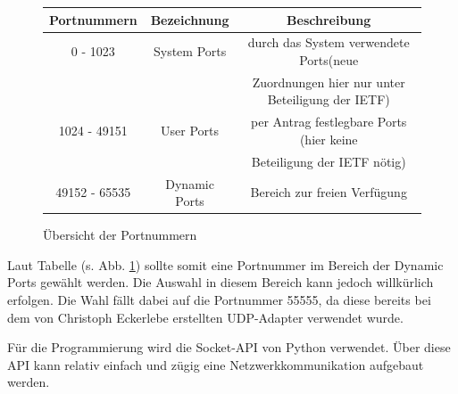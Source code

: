 \documentclass[12pt,a4paper]{report}
\begin{document}
\begin{figure}[H]
\begin{center}
\begin{tabular}{|c|c|c|}
\hline
Portnummern & Bezeichnung & Beschreibung \\
\hline\hline
0 - 1023 & System Ports & durch das System verwendete Ports(neue\\&&Zuordnungen hier nur unter Beteiligung der IETF)\\
1024 - 49151 & User Ports & per Antrag festlegbare Ports (hier keine\\&&Beteiligung der IETF nötig)\\
49152 - 65535 & Dynamic Ports & Bereich zur freien Verfügung\\
\hline
\end{tabular}
\caption{Übersicht der Portnummern \cite{WikipediaPort}\cite{IETFRFC6335}}\label{tab:Uebersicht der Portnummern}
\end{center}
\end{figure}
\noindent Laut Tabelle (s. Abb. \ref{tab:Uebersicht der Portnummern}) sollte somit eine Portnummer im Bereich der Dynamic Ports gewählt werden. Die Auswahl in diesem Bereich kann jedoch willkürlich erfolgen. Die Wahl fällt dabei auf die Portnummer 55555, da diese bereits bei dem von Christoph Eckerlebe erstellten UDP-Adapter verwendet wurde.

Für die Programmierung wird die Socket-API von Python verwendet. Über diese API kann relativ einfach und zügig eine Netzwerkkommunikation aufgebaut werden.
\end{document}
